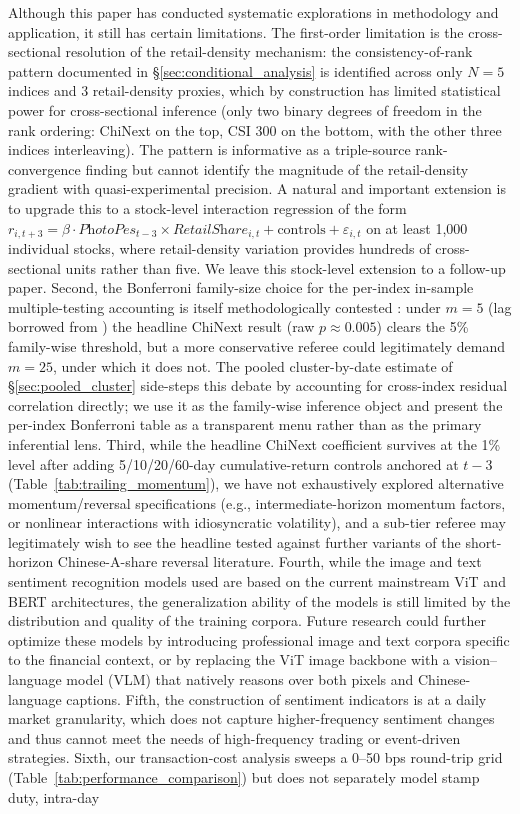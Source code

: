 \documentclass[AER]{AEA}
\begin{document}
Although this paper has conducted systematic explorations in methodology and application, it still has certain limitations. The first-order limitation is the cross-sectional resolution of the retail-density mechanism: the consistency-of-rank pattern documented in \S\ref{sec:conditional_analysis} is identified across only $N=5$ indices and $3$ retail-density proxies, which by construction has limited statistical power for cross-sectional inference (only two binary degrees of freedom in the rank ordering: ChiNext on the top, CSI 300 on the bottom, with the other three indices interleaving). The pattern is informative as a triple-source rank-convergence finding but cannot identify the magnitude of the retail-density gradient with quasi-experimental precision. A natural and important extension is to upgrade this to a stock-level interaction regression of the form $r_{i,t+3} = \beta \cdot \textit{PhotoPes}_{t-3} \times \textit{RetailShare}_{i,t} + \text{controls} + \varepsilon_{i,t}$ on at least 1{,}000 individual stocks, where retail-density variation provides hundreds of cross-sectional units rather than five. We leave this stock-level extension to a follow-up paper. Second, the Bonferroni family-size choice for the per-index in-sample multiple-testing accounting is itself methodologically contested \citep{harvey2016cross}: under $m=5$ (lag borrowed from \citet{obaid2022picture}) the headline ChiNext result (raw $p\approx 0.005$) clears the 5\% family-wise threshold, but a more conservative referee could legitimately demand $m=25$, under which it does not. The pooled cluster-by-date estimate of \S\ref{sec:pooled_cluster} side-steps this debate by accounting for cross-index residual correlation directly; we use it as the family-wise inference object and present the per-index Bonferroni table as a transparent menu rather than as the primary inferential lens. Third, while the headline ChiNext coefficient survives at the 1\% level after adding 5/10/20/60-day cumulative-return controls anchored at $t-3$ (Table~\ref{tab:trailing_momentum}), we have not exhaustively explored alternative momentum/reversal specifications (e.g., intermediate-horizon momentum factors, or nonlinear interactions with idiosyncratic volatility), and a sub-tier referee may legitimately wish to see the headline tested against further variants of the short-horizon Chinese-A-share reversal literature. Fourth, while the image and text sentiment recognition models used are based on the current mainstream ViT and BERT architectures, the generalization ability of the models is still limited by the distribution and quality of the training corpora. Future research could further optimize these models by introducing professional image and text corpora specific to the financial context, or by replacing the ViT image backbone with a vision--language model (VLM) that natively reasons over both pixels and Chinese-language captions. Fifth, the construction of sentiment indicators is at a daily market granularity, which does not capture higher-frequency sentiment changes and thus cannot meet the needs of high-frequency trading or event-driven strategies. Sixth, our transaction-cost analysis sweeps a 0--50 bps round-trip grid (Table~\ref{tab:performance_comparison}) but does not separately model stamp duty, intra-day 
\end{document}
